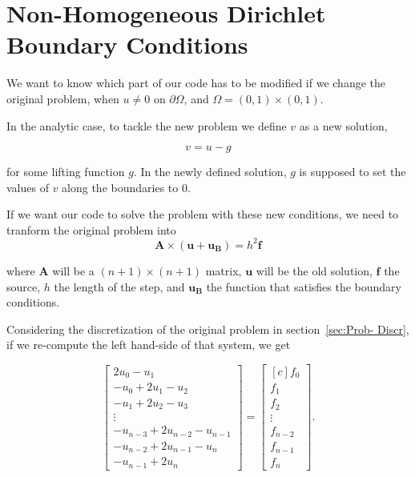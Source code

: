 \documentclass[fontsize=11pt,paper=a4,titlepage]{article}
\begin{document}
\section{Non-Homogeneous Dirichlet Boundary Conditions}

We want to know which part of our code has to be modified if we change the
original problem, when $u \neq 0$ on $\partial\Omega$, and $\Omega = (0,1)
\times (0,1)$.

In the analytic case, to tackle the new problem we define $v$ as a new solution,

\begin{equation}
	v = u - g
\end{equation}

for some lifting function $g$. In the newly defined solution, $g$ is supposed to
set the values of $v$ along the boundaries to $0$.

If we want our code to solve the problem with these new conditions, we need to
tranform the original problem into
\begin{displaymath}
	\mathbf{A} \times (\mathbf{u} + \mathbf{u_B}) = h^2 \mathbf{f}
\end{displaymath}

where $\mathbf{A}$ will be a $(n + 1) \times (n + 1)$ matrix, $\mathbf{u}$ will
be the old solution, $\mathbf{f}$ the source, $h$ the length of the step, and
$\mathbf{u_B}$ the function that satisfies the boundary conditions.

Considering the discretization of the original problem in section~\ref{sec:Prob-
Discr}, if we re-compute the left hand-side of that system, we get

\begin{displaymath}
\begin{bmatrix}
	2u_0 - u_1 \\
	- u_0 + 2u_1 - u_2 \\
	- u_1 + 2u_2 - u_3 \\
	\vdots \\
	- u_{n - 3} + 2u_{n - 2} - u_{n - 1} \\
	- u_{n - 2} + 2u_{n - 1} - u_{n} \\
	- u_{n - 1} + 2u_n
\end{bmatrix}
=
\begin{bmatrix*}[c]
	f_0 \\
	f_1 \\
	f_2 \\
	\vdots \\
	f_{n - 2} \\
	f_{n - 1} \\
	f_n
\end{bmatrix*}.
\end{displaymath}
\end{document}
